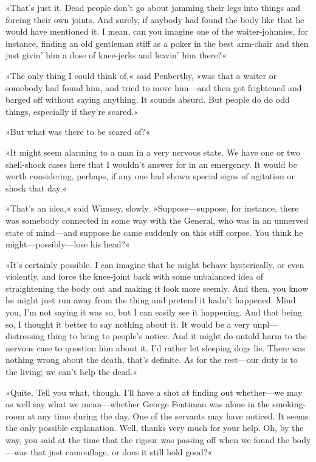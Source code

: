 »That's just it. Dead people don't go about jamming their legs into things and forcing their own joints. And surely, if anybody had found the body like that he would have mentioned it. I mean, can you imagine one of the waiter-johnnies, for instance, finding an old gentleman stiff as a poker in the best arm-chair and then just givin' him a dose of knee-jerks and leavin' him there?«

»The only thing I could think of,« said Penberthy, »was that a waiter or somebody had found him, and tried to move him\allowbreak---\allowbreak and then got frightened and barged off without saying anything. It sounds absurd. But people do do odd things, especially if they're scared.«

»But what was there to be scared of?«

»It might seem alarming to a man in a very nervous state. We have one or two shell-shock cases here that I wouldn't answer for in an emergency. It would be worth considering, perhaps, if any one had shown special signs of agitation or shock that day.«

»That's an idea,« said Wimsey, slowly. »Suppose\allowbreak---\allowbreak suppose, for instance, there was somebody connected in some way with the General, who was in an unnerved state of mind\allowbreak---\allowbreak and suppose he came suddenly on this stiff corpse. You think he might\allowbreak---\allowbreak possibly---lose his head?«

»It's certainly possible. I can imagine that he might behave hysterically, or even violently, and force the knee-joint back with some unbalanced idea of straightening the body out and making it look more seemly. And then, you know he might just run away from the thing and pretend it hadn't happened. Mind you, I'm not saying it was so, but I can easily see it happening. And that being so, I thought it better to say nothing about it. It would be a very unpl\allowbreak---\allowbreak distressing thing to bring to people's notice. And it might do untold harm to the nervous case to question him about it. I'd rather let sleeping dogs lie. There was nothing wrong about the death, that's definite. As for the rest\allowbreak---\allowbreak our duty is to the living; we can't help the dead.«

»Quite. Tell you what, though, I'll have a shot at finding out whether\allowbreak---\allowbreak we may as well say what we mean\allowbreak---\allowbreak whether George Fentiman was alone in the smoking-room at any time during the day. One of the servants may have noticed. It seems the only possible explanation. Well, thanks very much for your help. Oh, by the way, you said at the time that the rigour was passing off when we found the body\allowbreak---\allowbreak was that just camouflage, or does it still hold good?«

